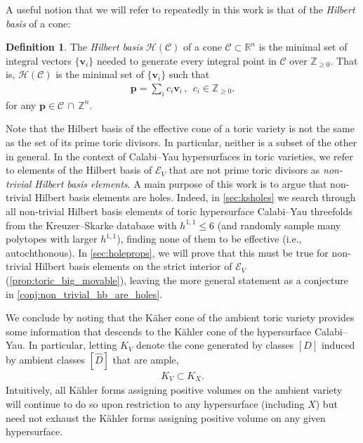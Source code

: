 \documentclass[11pt,dvipsnames]{article}
\theoremstyle{definition}
\newtheorem{definition}[theorem]{Definition}
\begin{document}
A useful notion that we will refer to repeatedly in this work is that of the \textit{Hilbert basis} of a cone:
\begin{definition}
    The \textit{Hilbert basis} $\mathcal{H}(\mathcal{C})$ of a cone $\mathcal{C} \subset \mathbb{R}^n$ is the minimal set of integral vectors $\{\mathbf{v}_i\}$ needed to generate every integral point in $\mathcal{C}$ over $\mathbb{Z}_{\geq 0}$. That is, $\mathcal{H}(\mathcal{C})$ is the minimal set of $\{\mathbf{v}_i\}$ such that
    \begin{align}
        \mathbf{p} = \sum_i c_i \mathbf{v}_i\,, \ \ c_i \in \mathbb{Z}_{\geq 0}.
    \end{align}
    for any $\mathbf{p} \in \mathcal{C} \, \cap \, \mathbb{Z}^n$.
\end{definition}
Note that the Hilbert basis of the effective cone of a toric variety is not the same as the set of its prime toric divisors. In particular, neither is a subset of the other in general. In the context of Calabi--Yau hypersurfaces in toric varieties, we refer to elements of the Hilbert basis of $\mathcal{E}_V$ that are not prime toric divisors as \textit{non-trivial Hilbert basis elements}. A main purpose of this work is to argue that non-trivial Hilbert basis elements are holes. Indeed, in \cref{sec:ksholes} we search through all non-trivial Hilbert basis elements of toric hypersurface Calabi--Yau threefolds from the Kreuzer--Skarke database with $h^{1,1} \leq 6$ (and randomly sample many polytopes with larger $h^{1,1}$), finding none of them to be effective (i.e., autochthonous). In \cref{sec:holeprops}, we will prove that this must be true for non-trivial Hilbert basis elements on the strict interior of $\mathcal{E}_V$ (\cref{prop:toric_big_movable}), leaving the more general statement as a conjecture in \cref{conj:non_trivial_hb_are_holes}.

We conclude by noting that the K\"aher cone of the ambient toric variety provides some information that descends to the K\"ahler cone of the hypersurface Calabi--Yau. In particular, letting $K_V$ denote the cone generated by classes $[D]$ induced by ambient classes $[\hat{D}]$ that are ample,
\begin{align}
    K_V \subset K_X.
\end{align}
Intuitively, all K\"ahler forms assigning positive volumes on the ambient variety will continue to do so upon restriction to any hypersurface (including $X$) but need not exhaust the K\"ahler forms assigning positive volume on any given hypersurface. 
\end{document}

